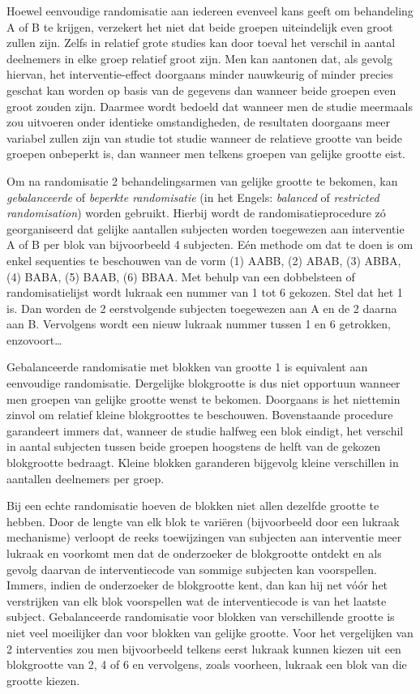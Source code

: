 \documentclass[
  dutch,
  letterpaper,
  12pt]{book}
\theoremstyle{definition}
\theoremstyle{definition}
\theoremstyle{definition}
\theoremstyle{remark}
\begin{document}
Hoewel eenvoudige randomisatie aan iedereen evenveel kans geeft om
behandeling A of B te krijgen, verzekert het niet dat beide groepen
uiteindelijk even groot zullen zijn. Zelfs in relatief grote studies kan
door toeval het verschil in aantal deelnemers in elke groep relatief
groot zijn. Men kan aantonen dat, als gevolg hiervan, het
interventie-effect doorgaans minder nauwkeurig of minder precies geschat
kan worden op basis van de gegevens dan wanneer beide groepen even groot
zouden zijn. Daarmee wordt bedoeld dat wanneer men de studie meermaals
zou uitvoeren onder identieke omstandigheden, de resultaten doorgaans
meer variabel zullen zijn van studie tot studie wanneer de relatieve
grootte van beide groepen onbeperkt is, dan wanneer men telkens groepen
van gelijke grootte eist.

Om na randomisatie 2 behandelingsarmen van gelijke grootte te bekomen,
kan \emph{gebalanceerde} of \emph{beperkte randomisatie} (in het Engels:
\emph{balanced} of \emph{restricted randomisation}) worden gebruikt.
Hierbij wordt de randomisatieprocedure zó georganiseerd dat gelijke
aantallen subjecten worden toegewezen aan interventie A of B per blok
van bijvoorbeeld 4 subjecten. Eén methode om dat te doen is om enkel
sequenties te beschouwen van de vorm (1) AABB, (2) ABAB, (3) ABBA, (4)
BABA, (5) BAAB, (6) BBAA. Met behulp van een dobbelsteen of
randomisatielijst wordt lukraak een nummer van 1 tot 6 gekozen. Stel dat
het 1 is. Dan worden de 2 eerstvolgende subjecten toegewezen aan A en de
2 daarna aan B. Vervolgens wordt een nieuw lukraak nummer tussen 1 en 6
getrokken, enzovoort\ldots{}

Gebalanceerde randomisatie met blokken van grootte 1 is equivalent aan
eenvoudige randomisatie. Dergelijke blokgrootte is dus niet opportuun
wanneer men groepen van gelijke grootte wenst te bekomen. Doorgaans is
het niettemin zinvol om relatief kleine blokgroottes te beschouwen.
Bovenstaande procedure garandeert immers dat, wanneer de studie halfweg
een blok eindigt, het verschil in aantal subjecten tussen beide groepen
hoogstens de helft van de gekozen blokgrootte bedraagt. Kleine blokken
garanderen bijgevolg kleine verschillen in aantallen deelnemers per
groep.

Bij een echte randomisatie hoeven de blokken niet allen dezelfde grootte
te hebben. Door de lengte van elk blok te variëren (bijvoorbeeld door
een lukraak mechanisme) verloopt de reeks toewijzingen van subjecten aan
interventie meer lukraak en voorkomt men dat de onderzoeker de
blokgrootte ontdekt en als gevolg daarvan de interventiecode van sommige
subjecten kan voorspellen. Immers, indien de onderzoeker de blokgrootte
kent, dan kan hij net vóór het verstrijken van elk blok voorspellen wat
de interventiecode is van het laatste subject. Gebalanceerde
randomisatie voor blokken van verschillende grootte is niet veel
moeilijker dan voor blokken van gelijke grootte. Voor het vergelijken
van 2 interventies zou men bijvoorbeeld telkens eerst lukraak kunnen
kiezen uit een blokgrootte van 2, 4 of 6 en vervolgens, zoals voorheen,
lukraak een blok van die grootte kiezen.
\end{document}
